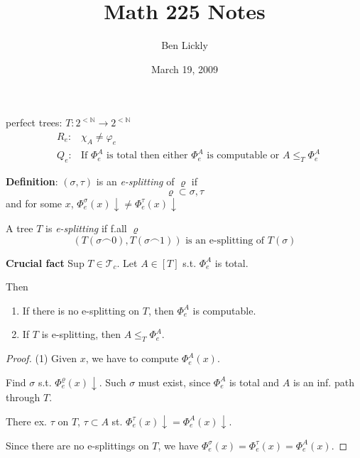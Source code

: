 \documentclass[12pt]{article}
\author{Ben Lickly}
\date{March 19, 2009}
\title{Math 225 Notes}
\newcommand{\Nat}{\ensuremath{\mathbb{N}}}
\newcommand{\defn}{\textbf{Definition}: }
\begin{document}
\maketitle

perfect trees: $T: 2^{<\Nat} \rightarrow 2^{<\Nat}$
\begin{align*}
  &R_e:& \chi_A \ne \varphi_e \\
  &Q_e:& \text{If } \Phi^A_e \text{ is total then either }
        \Phi^A_e \text{ is computable or } A \le_T \Phi^A_e
\end{align*}

\defn $(\sigma,\tau)$ is an \emph{e-splitting} of $\varrho$ if
  \[
  \varrho \subset \sigma,\tau
  \]
  and for some $x$, 
  $\Phi^\sigma_e(x)\downarrow \ne \Phi^\tau_e(x)\downarrow$

  A tree $T$ is \emph{e-splitting} if f.all $\varrho$
  \[
       \left(
        T(\sigma\frown 0), T(\sigma\frown 1)
        \right) \text{ is an e-splitting of $T(\sigma)$}
  \]

  
\textbf{Crucial fact}
Sup $T \in \mathcal{T}_c$.
Let $A \in [T]$ s.t. $\Phi^A_e$ is  total.

Then
\begin{enumerate}[(1)]
  \item If there is no e-splitting on $T$,
    then $\Phi^A_e$ is computable.
  \item If $T$ is e-splitting, then $A \le_T \Phi^A_e$. 
\end{enumerate}

\begin{proof}
  (1) Given $x$, we have to compute $\Phi^A_e(x)$.
  
  Find $\sigma$ s.t. $\Phi^\varrho_e(x)\downarrow$.
  Such $\sigma$ must exist, since $\Phi^A_e$ is total
  and $A$ is an inf. path through $T$.

  There ex. $\tau$ on $T$, $\tau\subset A$ st. 
  $\Phi^\tau_e(x) \downarrow = \Phi^A_e(x) \downarrow$. 

  Since there are no e-splittings on $T$, we have 
  $\Phi^\sigma_e(x) = \Phi^\tau_e(x) = \Phi^A_e(x)$.
\end{proof}
\end{document}
